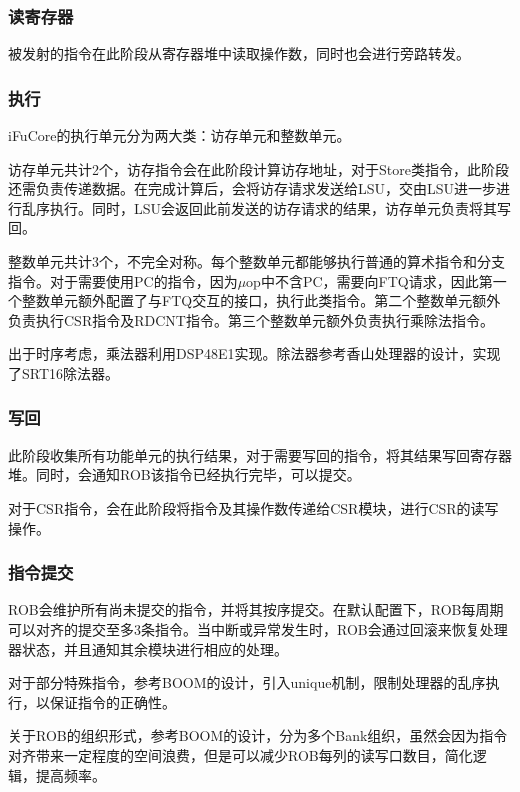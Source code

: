 \documentclass{article}
\begin{document}
\subsubsection{读寄存器}
被发射的指令在此阶段从寄存器堆中读取操作数，同时也会进行旁路转发。

\subsubsection{执行}
iFuCore的执行单元分为两大类：访存单元和整数单元。\par
访存单元共计2个，访存指令会在此阶段计算访存地址，对于Store类指令，此阶段还需负责传递数据。在完成计算后，会将访存请求发送给LSU，交由LSU进一步进行乱序执行。同时，LSU会返回此前发送的访存请求的结果，访存单元负责将其写回。\par
整数单元共计3个，不完全对称。每个整数单元都能够执行普通的算术指令和分支指令。对于需要使用PC的指令，因为$\mu$op中不含PC，需要向FTQ请求，因此第一个整数单元额外配置了与FTQ交互的接口，执行此类指令。第二个整数单元额外负责执行CSR指令及RDCNT指令。第三个整数单元额外负责执行乘除法指令。\par
出于时序考虑，乘法器利用DSP48E1实现。除法器参考香山处理器的设计，实现了SRT16除法器。\par

\subsubsection{写回}
此阶段收集所有功能单元的执行结果，对于需要写回的指令，将其结果写回寄存器堆。同时，会通知ROB该指令已经执行完毕，可以提交。\par
对于CSR指令，会在此阶段将指令及其操作数传递给CSR模块，进行CSR的读写操作。\par

\subsubsection{指令提交}
ROB会维护所有尚未提交的指令，并将其按序提交。在默认配置下，ROB每周期可以对齐的提交至多3条指令。当中断或异常发生时，ROB会通过回滚来恢复处理器状态，并且通知其余模块进行相应的处理。\par
对于部分特殊指令，参考BOOM的设计，引入unique机制，限制处理器的乱序执行，以保证指令的正确性。\par
关于ROB的组织形式，参考BOOM的设计，分为多个Bank组织，虽然会因为指令对齐带来一定程度的空间浪费，但是可以减少ROB每列的读写口数目，简化逻辑，提高频率。\par
\end{document}
